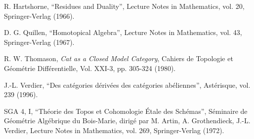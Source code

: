 \noindent R. Hartshorne, ``Residues and Duality'', Lecture Notes in Mathematics, vol. 20, Springer-Verlag (1966).

\noindent D. G. Quillen, ``Homotopical Algebra'', Lecture Notes in Mathematics, vol. 43, Springer-Verlag (1967).

\noindent R. W. Thomason, \textit{Cat as a Closed Model Category}, Cahiers de Topologie et Géométrie Différentielle, Vol. XXI-3, pp. 305-324 (1980).

\noindent J.-L. Verdier, ``Des catégories dérivées des catégories abéliennes'', Astérisque, vol. 239 (1996).

\noindent SGA 4, I, ``Théorie des Topos et Cohomologie Étale des Schémas'', Séminaire de Géométrie Algébrique du Bois-Marie, dirigé par M. Artin, A. Grothendieck, J.-L. Verdier, Lecture Notes in Mathematics, vol. 269, Springer-Verlag (1972).
